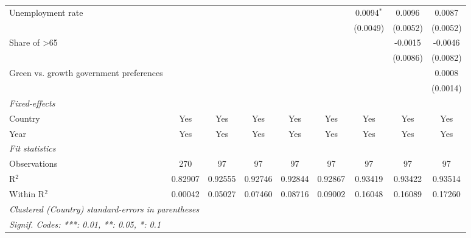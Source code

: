 \begin{table}[htbp]
\begin{tabular}{lcccccccc}
      Unemployment rate                            &          &          &              &              &          & 0.0094$^{*}$          & 0.0096   & 0.0087\\   
                                                   &          &          &              &              &          & (0.0049)              & (0.0052) & (0.0052)\\   
      Share of >65                                 &          &          &              &              &          &                       & -0.0015  & -0.0046\\   
                                                   &          &          &              &              &          &                       & (0.0086) & (0.0082)\\   
      Green vs. growth government preferences      &          &          &              &              &          &                       &          & 0.0008\\   
                                                   &          &          &              &              &          &                       &          & (0.0014)\\   
      \midrule
      \emph{Fixed-effects}\\
      Country                                      & Yes      & Yes      & Yes          & Yes          & Yes      & Yes                   & Yes      & Yes\\  
      Year                                         & Yes      & Yes      & Yes          & Yes          & Yes      & Yes                   & Yes      & Yes\\  
      \midrule
      \emph{Fit statistics}\\
      Observations                                 & 270      & 97       & 97           & 97           & 97       & 97                    & 97       & 97\\  
      R$^2$                                        & 0.82907  & 0.92555  & 0.92746      & 0.92844      & 0.92867  & 0.93419               & 0.93422  & 0.93514\\  
      Within R$^2$                                 & 0.00042  & 0.05027  & 0.07460      & 0.08716      & 0.09002  & 0.16048               & 0.16089  & 0.17260\\  
      \midrule \midrule
      \multicolumn{9}{l}{\emph{Clustered (Country) standard-errors in parentheses}}\\
      \multicolumn{9}{l}{\emph{Signif. Codes: ***: 0.01, **: 0.05, *: 0.1}}\\
   \end{tabular}
\end{table}


